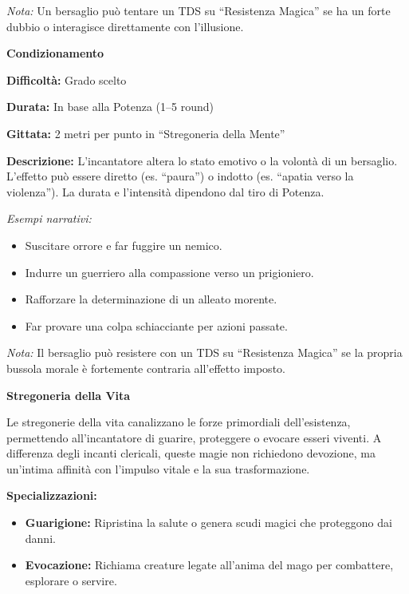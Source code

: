 \documentclass[./magie.tex]{subfiles}
\begin{document}
\textit{Nota:} Un bersaglio può tentare un TDS su “Resistenza Magica” se ha un forte dubbio o interagisce direttamente con l’illusione.

\clearpage
{\zarafirtitlefont\Large\bfseries\noindent Condizionamento}\\
\begin{description}
\item \textbf{Difficoltà:} Grado scelto
\item \textbf{Durata:} In base alla Potenza (1–5 round)
\item \textbf{Gittata:} 2 metri per punto in “Stregoneria della Mente”
\item \textbf{Descrizione:} L’incantatore altera lo stato emotivo o la volontà di un bersaglio. L’effetto può essere diretto (es. “paura”) o indotto (es. “apatia verso la violenza”). La durata e l’intensità dipendono dal tiro di Potenza.
\end{description}

\textit{Esempi narrativi:}
\begin{itemize}
\item Suscitare orrore e far fuggire un nemico.
\item Indurre un guerriero alla compassione verso un prigioniero.
\item Rafforzare la determinazione di un alleato morente.
\item Far provare una colpa schiacciante per azioni passate.
\end{itemize}

\textit{Nota:} Il bersaglio può resistere con un TDS su “Resistenza Magica” se la propria bussola morale è fortemente contraria all’effetto imposto.

\clearpage
\vspace{0.2cm}
{\zarafirtitlefont\Large\bfseries Stregoneria della Vita}

Le stregonerie della vita canalizzano le forze primordiali dell’esistenza, permettendo all’incantatore di guarire, proteggere o evocare esseri viventi. A differenza degli incanti clericali, queste magie non richiedono devozione, ma un’intima affinità con l’impulso vitale e la sua trasformazione.

\textbf{Specializzazioni:}
\begin{itemize}
\item \textbf{Guarigione:} Ripristina la salute o genera scudi magici che proteggono dai danni.
\item \textbf{Evocazione:} Richiama creature legate all’anima del mago per combattere, esplorare o servire.
\end{itemize}
\end{document}

